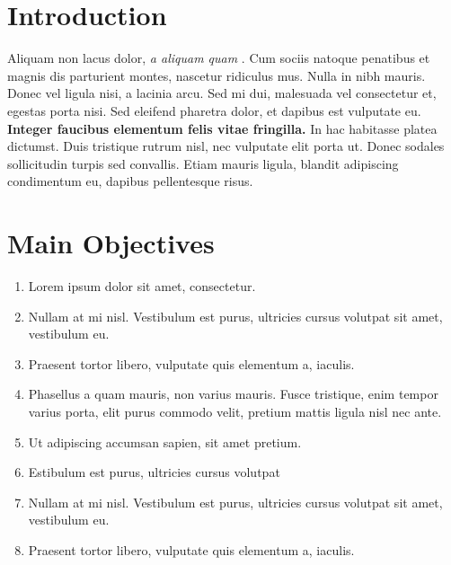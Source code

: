 \documentclass[a0,landscape]{a0poster}
\begin{document}
\begin{multicols}{4}
    \section*{Introduction}


    Aliquam non lacus dolor, \textit{a aliquam quam} \cite{Smith:2012qr}. Cum sociis natoque penatibus et magnis dis parturient montes, nascetur ridiculus mus. Nulla in nibh mauris. Donec vel ligula nisi, a lacinia arcu. Sed mi dui, malesuada vel consectetur et, egestas porta nisi. Sed eleifend pharetra dolor, et dapibus est vulputate eu. \textbf{Integer faucibus elementum felis vitae fringilla.} In hac habitasse platea dictumst. Duis tristique rutrum nisl, nec vulputate elit porta ut. Donec sodales sollicitudin turpis sed convallis. Etiam mauris ligula, blandit adipiscing condimentum eu, dapibus pellentesque risus.






    \color{DarkSlateGray} %

    \section*{Main Objectives}

    \begin{enumerate}
        \item Lorem ipsum dolor sit amet, consectetur.
        \item Nullam at mi nisl. Vestibulum est purus, ultricies cursus volutpat sit amet, vestibulum eu.
        \item Praesent tortor libero, vulputate quis elementum a, iaculis.
        \item Phasellus a quam mauris, non varius mauris. Fusce tristique, enim tempor varius porta, elit purus commodo velit, pretium mattis ligula nisl nec ante.
        \item Ut adipiscing accumsan sapien, sit amet pretium.
        \item Estibulum est purus, ultricies cursus volutpat
        \item Nullam at mi nisl. Vestibulum est purus, ultricies cursus volutpat sit amet, vestibulum eu.
        \item Praesent tortor libero, vulputate quis elementum a, iaculis.
    \end{enumerate}


\end{multicols}
\end{document}
